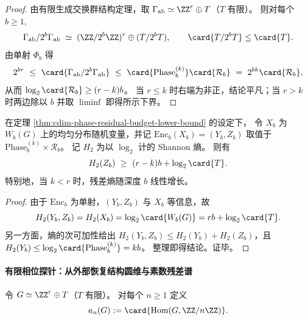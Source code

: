 \begin{proof}
由有限生成交换群结构定理，取 \(\Gamma_{\mathrm{ab}}\simeq \ZZ^r\oplus T\)（\(T\) 有限）。
则对每个 \(b\ge 1\),
\[
\Gamma_{\mathrm{ab}}/2^b\Gamma_{\mathrm{ab}}
\;\simeq\;
(\ZZ/2^b\ZZ)^r\oplus (T/2^bT),
\qquad
\card{T/2^bT}\le \card{T}.
\]
由单射 \(\Phi_b\) 得
\[
2^{br}\ \le\ \card{\Gamma_{\mathrm{ab}}/2^b\Gamma_{\mathrm{ab}}}
\ \le\ 
\card{\mathrm{Phase}_b^{(k)}}\card{\mathcal{R}_b}
\ =\ 
2^{bk}\card{\mathcal{R}_b},
\]
从而 \(\log_2\card{\mathcal{R}_b}\ge (r-k)b\)。
当 \(r\le k\) 时右端为非正，结论平凡；当 \(r>k\) 时两边除以 \(b\) 并取 \(\liminf\) 即得所示下界。
\end{proof}

\begin{theorem}[残差熵的线性下界]\label{thm:cdim-residual-entropy-lower-bound}
在定理 \ref{thm:cdim-phase-residual-budget-lower-bound} 的设定下，
令 \(X_b\) 为 \(W_b(G)\) 上的均匀分布随机变量，并记
\(\mathrm{Enc}_b(X_b)=(Y_b,Z_b)\) 取值于 \(\mathrm{Phase}_b^{(k)}\times\mathcal{R}_b\)。
记 \(H_2\) 为以 \(\log_2\) 计的 Shannon 熵。
则有
\[
H_2(Z_b)\ \ge\ (r-k)b+\log_2\card{T}.
\]
特别地，当 \(k<r\) 时，残差熵随深度 \(b\) 线性增长。
\end{theorem}
\begin{proof}
由于 \(\mathrm{Enc}_b\) 为单射，\((Y_b,Z_b)\) 与 \(X_b\) 等信息，故
\[
H_2(Y_b,Z_b)=H_2(X_b)=\log_2\card{W_b(G)}=rb+\log_2\card{T}.
\]
另一方面，熵的次可加性给出 \(H_2(Y_b,Z_b)\le H_2(Y_b)+H_2(Z_b)\)，且
\(
H_2(Y_b)\le \log_2\card{\mathrm{Phase}_b^{(k)}}=kb
\)。
整理即得结论。证毕。
\end{proof}

\paragraph{有限相位探针：从外部恢复结构圆维与素数残差谱}
令 \(G\simeq \ZZ^r\oplus T\)（\(T\) 有限）。
对每个 \(n\ge 1\) 定义
\[
a_n(G):=\card{\operatorname{Hom}(G,\ZZ/n\ZZ)}.
\]

